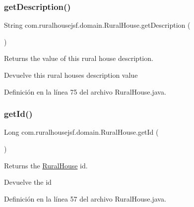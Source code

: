 \subsubsection{\texorpdfstring{getDescription()}{getDescription()}}
{\footnotesize\ttfamily String com.\+ruralhousejsf.\+domain.\+Rural\+House.\+get\+Description (\begin{DoxyParamCaption}{ }\end{DoxyParamCaption})}



Returns the value of this rural house description. 

\begin{DoxyReturn}{Devuelve}
this rural houses description value 
\end{DoxyReturn}


Definición en la línea 75 del archivo Rural\+House.\+java.

\mbox{\label{classcom_1_1ruralhousejsf_1_1domain_1_1_rural_house_adae53723eac123b55f8122e89cdfe9c3}} 
\subsubsection{\texorpdfstring{getId()}{getId()}}
{\footnotesize\ttfamily Long com.\+ruralhousejsf.\+domain.\+Rural\+House.\+get\+Id (\begin{DoxyParamCaption}{ }\end{DoxyParamCaption})}



Returns the \mbox{\hyperlink{classcom_1_1ruralhousejsf_1_1domain_1_1_rural_house}{Rural\+House}} id. 

\begin{DoxyReturn}{Devuelve}
the id 
\end{DoxyReturn}


Definición en la línea 57 del archivo Rural\+House.\+java.

\mbox{\label{classcom_1_1ruralhousejsf_1_1domain_1_1_rural_house_a8e5bd3ba4e562e0c1e57e762cdee9447}} 
